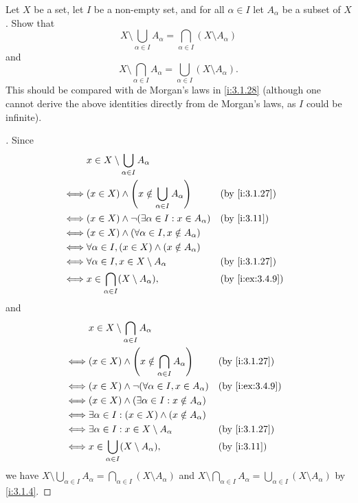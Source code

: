 \begin{ex}\label{i:ex:3.4.11}
  Let \(X\) be a set, let \(I\) be a non-empty set, and for all \(\alpha \in I\) let \(A_\alpha\) be a subset of \(X\).
  Show that
  \[
    X \setminus \bigcup_{\alpha \in I} A_\alpha = \bigcap_{\alpha \in I} (X \setminus A_\alpha)
  \]
  and
  \[
    X \setminus \bigcap_{\alpha \in I} A_\alpha = \bigcup_{\alpha \in I} (X \setminus A_\alpha).
  \]
  This should be compared with de Morgan's laws in \cref{i:3.1.28}
  (although one cannot derive the above identities directly from de Morgan's laws, as \(I\) could be infinite).
\end{ex}

\begin{proof}[]
  Since
  \begin{align*}
         & x \in X \setminus \bigcup_{\alpha \in I} A_\alpha                                  \\
    \iff & (x \in X) \land \pa{x \notin \bigcup_{\alpha \in I} A_\alpha} &  & \by{i:3.1.27}   \\
    \iff & (x \in X) \land \lnot(\exists \alpha \in I : x \in A_\alpha)  &  & \by{i:3.11}     \\
    \iff & (x \in X) \land (\forall \alpha \in I, x \notin A_\alpha)                          \\
    \iff & \forall \alpha \in I, (x \in X) \land (x \notin A_\alpha)                          \\
    \iff & \forall \alpha \in I, x \in X \setminus A_\alpha              &  & \by{i:3.1.27}   \\
    \iff & x \in \bigcap_{\alpha \in I} (X \setminus A_\alpha),          &  & \by{i:ex:3.4.9}
  \end{align*}
  and
  \begin{align*}
         & x \in X \setminus \bigcap_{\alpha \in I} A_\alpha                                  \\
    \iff & (x \in X) \land \pa{x \notin \bigcap_{\alpha \in I} A_\alpha} &  & \by{i:3.1.27}   \\
    \iff & (x \in X) \land \lnot(\forall \alpha \in I, x \in A_\alpha)   &  & \by{i:ex:3.4.9} \\
    \iff & (x \in X) \land (\exists \alpha \in I : x \notin A_\alpha)                         \\
    \iff & \exists \alpha \in I : (x \in X) \land (x \notin A_\alpha)                         \\
    \iff & \exists \alpha \in I : x \in X \setminus A_\alpha             &  & \by{i:3.1.27}   \\
    \iff & x \in \bigcup_{\alpha \in I} (X \setminus A_\alpha),          &  & \by{i:3.11}
  \end{align*}
  we have \(X \setminus \bigcup_{\alpha \in I} A_\alpha = \bigcap_{\alpha \in I} (X \setminus A_\alpha)\) and \(X \setminus \bigcap_{\alpha \in I} A_\alpha = \bigcup_{\alpha \in I} (X \setminus A_\alpha)\) by \cref{i:3.1.4}.
\end{proof}
